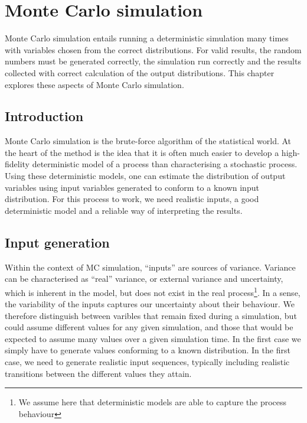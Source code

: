 \chapter{Monte Carlo simulation}

\begin{overview}
  Monte Carlo simulation entails running a deterministic simulation
  many times with variables chosen from the correct distributions.
  For valid results, the random numbers must be generated correctly,
  the simulation run correctly and the results collected with correct
  calculation of the output distributions.  This chapter explores
  these aspects of Monte Carlo simulation.
\end{overview}

\section{Introduction}
Monte Carlo simulation is the brute-force algorithm of the statistical world. At
the heart of the method is the idea that it is often much easier to develop a
high-fidelity deterministic model of a process than characterising a stochastic
process.  Using these deterministic models, one can estimate the distribution of
output variables using input variables generated to conform to a known input
distribution.  For this process to work, we need realistic inputs, a good
deterministic model and a reliable way of interpreting the results.


\section{Input generation}
Within the context of MC simulation, ``inputs'' are sources of variance. Variance
can be characterised as ``real'' variance, or external variance and uncertainty,
which is inherent in the model, but does not exist in the real
process\footnote{We assume here that deterministic models are able to capture the
process behaviour}.  In a sense, the variability of the inputs captures our
uncertainty about their behaviour.  We therefore distinguish between  varibles 
that remain fixed during a simulation, but could assume different values for any
given simulation, and those that would be expected to assume many values over a
given simulation time.  In the first case we simply have to generate values
conforming to a known distribution.  In the first case, we need to generate
realistic input sequences, typically including  realistic transitions between the
different values they attain.

